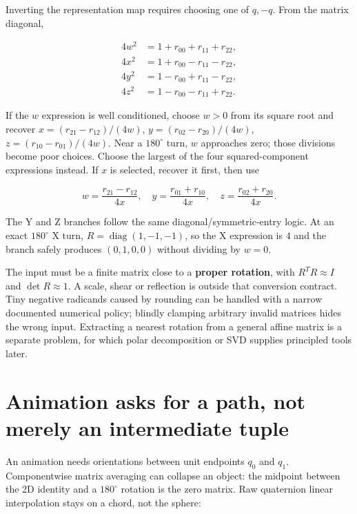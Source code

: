 Inverting the representation map requires choosing one of \(q,-q\). From the matrix diagonal,

\[
\begin{aligned}
4w^2&=1+r_{00}+r_{11}+r_{22},\\
4x^2&=1+r_{00}-r_{11}-r_{22},\\
4y^2&=1-r_{00}+r_{11}-r_{22},\\
4z^2&=1-r_{00}-r_{11}+r_{22}.
\end{aligned}
\]

If the \(w\) expression is well conditioned, choose \(w>0\) from its square root and recover \(x=(r_{21}-r_{12})/(4w)\), \(y=(r_{02}-r_{20})/(4w)\), \(z=(r_{10}-r_{01})/(4w)\). Near a \(180^\circ\) turn, \(w\) approaches zero; those divisions become poor choices. Choose the largest of the four squared-component expressions instead. If \(x\) is selected, recover it first, then use

\[
w=\frac{r_{21}-r_{12}}{4x},\quad
y=\frac{r_{01}+r_{10}}{4x},\quad
z=\frac{r_{02}+r_{20}}{4x}.
\]

The Y and Z branches follow the same diagonal/symmetric-entry logic. At an exact \(180^\circ\) X turn, \(R=\operatorname{diag}(1,-1,-1)\), so the X expression is \(4\) and the branch safely produces \((0,1,0,0)\) without dividing by \(w=0\).

The input must be a finite matrix close to a \textbf{proper rotation}, with \(R^TR\approx I\) and \(\det R\approx1\). A scale, shear or reflection is outside that conversion contract. Tiny negative radicands caused by rounding can be handled with a narrow documented numerical policy; blindly clamping arbitrary invalid matrices hides the wrong input. Extracting a nearest rotation from a general affine matrix is a separate problem, for which polar decomposition or SVD supplies principled tools later.

\section{Animation asks for a path, not merely an intermediate tuple}\label{01-foundations-i-ch019-animation-asks-for-a-path-not-merely-an-intermediate-tuple}

An animation needs orientations between unit endpoints \(q_0\) and \(q_1\). Componentwise matrix averaging can collapse an object: the midpoint between the 2D identity and a \(180^\circ\) rotation is the zero matrix. Raw quaternion linear interpolation stays on a chord, not the sphere:

